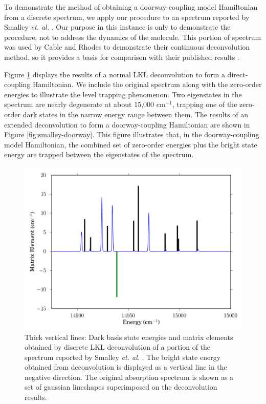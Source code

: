 \documentclass[12pt]{mitthesis}
\begin{document}
To demonstrate the method of obtaining a doorway-coupling model
Hamiltonian from a discrete spectrum, we apply our procedure to an
 spectrum reported by Smalley \emph{et. al.} \cite{smalley75}.
Our purpose in this instance is only to demonstrate the procedure, not
to address the dynamics of the  molecule. This portion of
spectrum was used by Cable and Rhodes to demonstrate their continuous
deconvolution method, so it provides a basis for comparison with their
published results \cite{cable80}.

Figure \ref{fig:smalley-direct} displays the results of a normal LKL
deconvolution to form a direct-coupling Hamiltonian.  We include the
original spectrum along with the zero-order energies to illustrate the
level trapping phenomenon.  Two eigenstates in the spectrum are nearly
degenerate at about 15,000 cm$^{-1}$, trapping one of the zero-order
dark states in the narrow energy range between them.  The results of
an extended deconvolution to form a doorway-coupling Hamiltonian are
shown in Figure \ref{fig:smalley-doorway}.  This figure illustrates
that, in the doorway-coupling model Hamiltonian, the combined set of
zero-order energies plus the bright state energy are trapped between
the eigenstates of the spectrum.  

\begin{figure}
  \caption{Thick vertical lines: Dark basis state energies and matrix
    elements obtained by discrete LKL deconvolution of a portion of the
     spectrum reported by Smalley \emph{et. al.}
    \cite{smalley75}.  The bright state energy obtained from
    deconvolution is displayed as a vertical line in the negative
    direction.  The original absorption spectrum is shown as a set of
    gaussian lineshapes superimposed on the deconvolution results.}
  \label{fig:smalley-direct}
  \centering
  \includegraphics[width=6in]{smalley-direct.png}
\end{figure}
\end{document}
